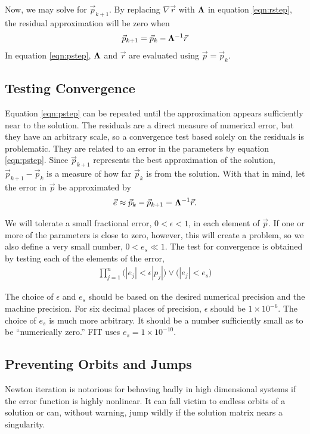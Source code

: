 \documentclass{article}
\def\p{\vec{p}}
\def\r{\vec{r}}
\def\LAM{{\bf \Lambda}}
\begin{document}
Now, we may solve for $\p_{k+1}$.  By replacing $\nabla \r$ with $\LAM$ in equation \ref{eqn:rstep}, the residual approximation will be zero when
\begin{align}
\p_{k+1} = \p_k - \LAM^{-1} \r\label{eqn:pstep}
\end{align}
In equation \ref{eqn:pstep}, $\LAM$ and $\r$ are evaluated using $\p=\p_k$.

\subsection{Testing Convergence}
Equation \ref{eqn:pstep} can be repeated until the approximation appears sufficiently near to the solution.  The residuals are a direct measure of numerical error, but they have an arbitrary scale, so a convergence test based solely on the residuals is problematic.  They are related to an error in the parameters by equation \ref{eqn:pstep}.  Since $\p_{k+1}$ represents the best approximation of the solution, $\p_{k+1} - \p_k$ is a measure of how far $\p_{k}$ is from the solution.  With that in mind, let the error in $\p$ be approximated by
\begin{align}
\vec{e} \approx \p_k - \p_{k+1}  = \LAM^{-1} \r.\label{eqn:e}
\end{align}

We will tolerate a small fractional error, $0<\epsilon<1$, in each element of $\p$.  If one or more of the parameters is close to zero, however, this will create a problem, so we also define a very small number, $0<e_s\ll 1$.  The test for convergence is obtained by testing each of the elements of the error,
\begin{align}
\prod_{j=1}^n \Big(|e_j| < \epsilon |p_j|\Big) \lor \Big(|e_j| < e_s\Big)
\end{align}

The choice of $\epsilon$ and $e_s$ should be based on the desired numerical precision and the machine precision.  For six decimal places of precision, $\epsilon$ should be $1\times10^{-6}$.  The choice of $e_s$ is much more arbitrary.  It should be a number sufficiently small as to be ``numerically zero.''  FIT uses $e_s = 1\times10^{-10}$.

\subsection{Preventing Orbits and Jumps}
Newton iteration is notorious for behaving badly in high dimensional systems if the error function is highly nonlinear.  It can fall victim to endless orbits of a solution or can, without warning, jump wildly if the solution matrix nears a singularity.  
\end{document}

